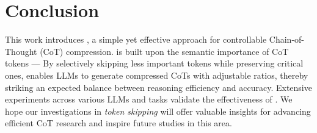 \section{Conclusion}
\label{sec:conclusion}

This work introduces \method, a simple yet effective approach for controllable Chain-of-Thought (CoT) compression. \method is built upon the semantic importance of CoT tokens --- By selectively skipping less important tokens while preserving critical ones, \method enables LLMs to generate compressed CoTs with adjustable ratios, thereby striking an expected balance between reasoning efficiency and accuracy. Extensive experiments across various LLMs and tasks validate the effectiveness of \method. We hope our investigations in \textit{token skipping} will offer valuable insights for advancing efficient CoT research and inspire future studies in this area.